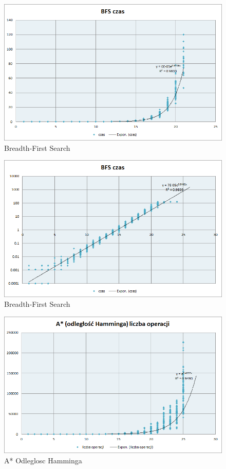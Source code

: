 \documentclass{classrep}
\begin{document}
\begin{figure}[ht]
\centering
			\includegraphics[scale=0.65]{pictures/BFS_czas_exp.png}
	\caption{Breadth-First Search}
	\label{fig:Breadth-First Search}
\end{figure}

\begin{figure}[ht]
\centering
			\includegraphics[scale=0.65]{pictures/BFS_czas_log.png}
	\caption{Breadth-First Search}
	\label{fig:Breadth-First Search}
\end{figure}

\begin{figure}[ht]
\centering
			\includegraphics[scale=0.65]{pictures/A2_operacje_exp.png}
	\caption{A* Odleglosc Hamminga}
	\label{fig:A* Odleglosc Hamminga}
\end{figure}
\end{document}
